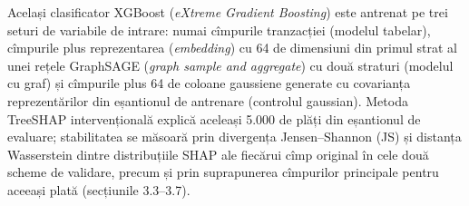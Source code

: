 \textbf{} %
{Același clasificator XGBoost (\emph{eXtreme Gradient Boosting}) este antrenat pe trei seturi de variabile de intrare: numai cîmpurile tranzacției (modelul tabelar), cîmpurile plus reprezentarea (\emph{embedding}) cu 64 de dimensiuni din primul strat al unei rețele GraphSAGE (\emph{graph sample and aggregate}) cu două straturi (modelul cu graf) și cîmpurile plus 64 de coloane gaussiene generate cu covarianța reprezentărilor din eșantionul de antrenare (controlul gaussian).
Metoda TreeSHAP intervențională explică aceleași 5.000 de plăți din eșantionul de evaluare; stabilitatea se măsoară prin divergența Jensen--Shannon (JS) și distanța Wasserstein dintre distribuțiile SHAP ale fiecărui cîmp original în cele două scheme de validare, precum și prin suprapunerea cîmpurilor principale pentru aceeași plată (secțiunile 3.3--3.7).}

